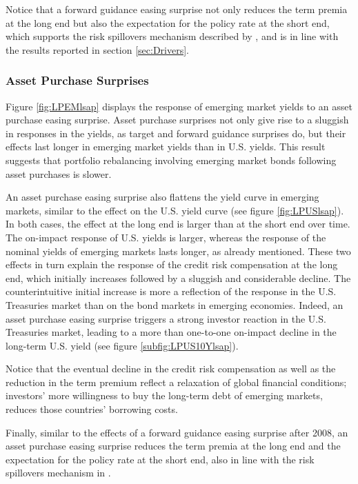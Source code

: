 {Notice that a forward guidance easing surprise not only reduces the term premia at the long end 
but also the expectation for the policy rate at the short end, which
supports the risk spillovers mechanism described by \cite{Kalemli-Ozcan:2019}, and is in line with the results reported in section \ref{sec:Drivers}.


\subsubsection{Asset Purchase Surprises}
\iftoggle{toclinks}{\gototoc}{} %

Figure \ref{fig:LPEMlsap} displays the response of emerging market yields to an asset purchase easing surprise. 
Asset purchase surprises not only give rise to a sluggish in responses in the yields, as target and forward guidance surprises do, but their effects last longer in emerging market yields than in U.S. yields. This result suggests that portfolio rebalancing involving emerging market bonds following asset purchases is slower.

An asset purchase easing surprise also flattens the yield curve in emerging markets, similar to the effect on the U.S. yield curve (see figure \ref{fig:LPUSlsap}). 
In both cases, the effect at the long end is larger than at the short end over time. 
The on-impact response of U.S. yields is larger, whereas the response of the nominal yields of emerging markets lasts longer, as already mentioned. 
These two effects in turn explain the response of the credit risk compensation at the long end, which initially increases followed by a sluggish and considerable decline. 
The counterintuitive initial increase is more a reflection of the response in the U.S. Treasuries market than on the bond markets in emerging economies. 
Indeed, an asset purchase easing surprise triggers a strong investor reaction in the U.S. Treasuries market, leading to a  more than one-to-one on-impact decline in the long-term U.S. yield (see figure \ref{subfig:LPUS10Ylsap}).

Notice that the eventual decline in the credit risk compensation as well as the reduction in the term premium reflect a relaxation of global financial conditions; investors' more willingness to buy the long-term debt of emerging markets, reduces those countries' borrowing costs. 

Finally, similar to the effects of a forward guidance easing surprise after 2008, an asset purchase easing surprise reduces the term premia at the long end and the expectation for the policy rate at the short end, also in line with the risk spillovers mechanism in \cite{Kalemli-Ozcan:2019}.

}{}	%


